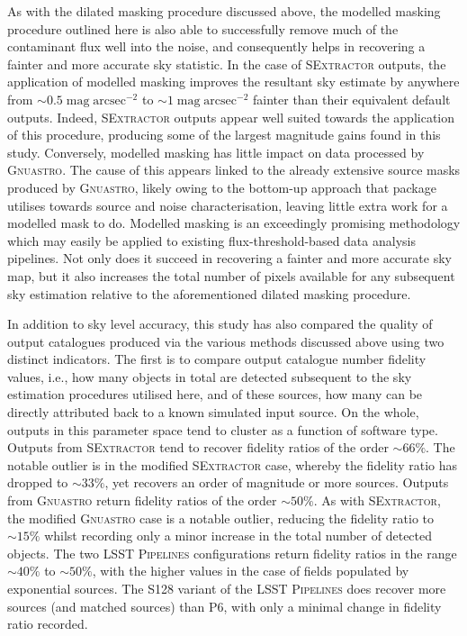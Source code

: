 \documentclass[fleqn,usenatbib,useAMS]{mnras}
\newcommand*{\about}{\mathord\sim}
\newcommand*{\SExtractor}{\textsc{SExtractor}\xspace}
\newcommand*{\Gnuastro}{\textsc{Gnuastro}\xspace}
\newcommand*{\LSSTPs}{\textsc{LSST Pipelines}\xspace}
\newcommand*{\DMA}{\textsc{P6}\xspace}
\newcommand*{\DMB}{\textsc{S128}\xspace}
\begin{document}
As with the dilated masking procedure discussed above, the modelled masking procedure outlined here is also able to successfully remove much of the contaminant flux well into the noise, and consequently helps in recovering a fainter and more accurate sky statistic. In the case of \SExtractor outputs, the application of modelled masking improves the resultant sky estimate by anywhere from $\about0.5\;\mathrm{mag\;arcsec}^{-2}$ to $\about1\;\mathrm{mag\;arcsec}^{-2}$ fainter than their equivalent default outputs. Indeed, \SExtractor outputs appear well suited towards the application of this procedure, producing some of the largest magnitude gains found in this study. Conversely, modelled masking has little impact on data processed by \Gnuastro. The cause of this appears linked to the already extensive source masks produced by \Gnuastro, likely owing to the bottom-up approach that package utilises towards source and noise characterisation, leaving little extra work for a modelled mask to do. Modelled masking is an exceedingly promising methodology which may easily be applied to existing flux-threshold-based data analysis pipelines. Not only does it succeed in recovering a fainter and more accurate sky map, but it also increases the total number of pixels available for any subsequent sky estimation relative to the aforementioned dilated masking procedure. 

In addition to sky level accuracy, this study has also compared the quality of output catalogues produced via the various methods discussed above using two distinct indicators. The first is to compare output catalogue number fidelity values, i.e., how many objects in total are detected subsequent to the sky estimation procedures utilised here, and of these sources, how many can be directly attributed back to a known simulated input source. On the whole, outputs in this parameter space tend to cluster as a function of software type. Outputs from \SExtractor tend to recover fidelity ratios of the order $\about66\%$. The notable outlier is in the modified \SExtractor case, whereby the fidelity ratio has dropped to $\about33\%$, yet recovers an order of magnitude or more sources. Outputs from \Gnuastro return fidelity ratios of the order $\about50\%$. As with \SExtractor, the modified \Gnuastro case is a notable outlier, reducing the fidelity ratio to $\about15\%$ whilst recording only a minor increase in the total number of detected objects. The two \LSSTPs configurations return fidelity ratios in the range $\about40\%$ to $\about50\%$, with the higher values in the case of fields populated by exponential sources. The \DMB variant of the \LSSTPs does recover more sources (and matched sources) than \DMA, with only a minimal change in fidelity ratio recorded. 
\end{document}
